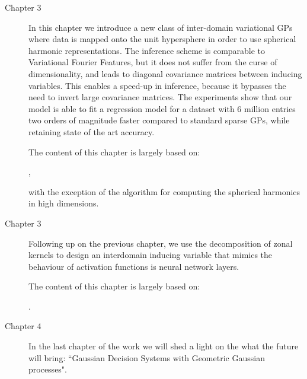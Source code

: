 \begin{description}
    \item[Chapter 3] In this chapter we introduce a new class of inter-domain variational GPs where data is mapped onto the unit hypersphere in order to use spherical harmonic representations. The inference scheme is comparable to Variational Fourier Features, but it does not suffer from the curse of dimensionality, and leads to diagonal covariance matrices between inducing variables. This enables a speed-up in inference, because it bypasses the need to invert large covariance matrices. The experiments show that our model is able to fit a regression model for a dataset with 6 million entries two orders of magnitude faster compared to standard sparse GPs, while retaining state of the art accuracy.
    
    The content of this chapter is largely based on:

    ,

    with the exception of the algorithm for computing the spherical harmonics in high dimensions.

    \item[Chapter 3] Following up on the previous chapter, we use the decomposition of zonal kernels to design an interdomain inducing variable that mimics the behaviour of activation functions is neural network layers. 

    The content of this chapter is largely based on:

    .

    \item[Chapter 4] In the last chapter of the work we will shed a light on the what the future will bring: ``Gaussian Decision Systems with Geometric Gaussian processes".
\end{description}
